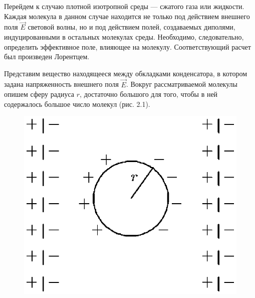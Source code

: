 Перейдем к случаю плотной изотропной среды --- сжатого газа или
жидкости. Каждая молекула в данном случае находится не только под
действием внешнего поля $\vec E$ световой волны, но и под
действием полей, создаваемых диполями, индуцированными в остальных
молекулах среды. Необходимо, следовательно, определить эффективное
поле, влияющее на молекулу. Соответствующий расчет был произведен
Лорентцем.

Представим вещество находящееся между обкладками конденсатора, в
котором задана напряженность внешнего поля $\vec E$. Вокруг
рассматриваемой молекулы опишем сферу радиуса $r$, достаточно
большого для того, чтобы в ней содержалось большое число молекул
(рис. 2.1).

\begin{figure}[tbp]
\centerline{\hbox{\includegraphics[scale=0.7]{Ris/ris_eps/ris2_01.eps}}}

\end{figure}


